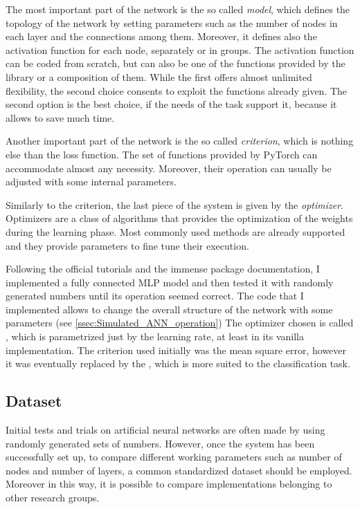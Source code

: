 The most important part of the network is the so called \textit{model}, which defines the topology of the network by setting parameters such as the number of nodes in each layer and the connections among them.
Moreover, it defines also the activation function for each node, separately or in groups.
The activation function can be coded from scratch, but can also be one of the functions provided by the library or a composition of them.
While the first offers almost unlimited flexibility, the second choice consents to exploit the functions already given.
The second option is the best choice, if the needs of the task support it, because it allows to save much time.

Another important part of the network is the so called \textit{criterion}, which is nothing else than the loss function.
The set of functions provided by PyTorch can accommodate almost any necessity.
Moreover, their operation can usually be adjusted with some internal parameters.

Similarly to the criterion, the last piece of the system is given by the \textit{optimizer}.
Optimizers are a class of algorithms that provides the optimization of the weights during the learning phase.
Most commonly used methods are already supported and they provide parameters to fine tune their execution.

Following the official tutorials and the immense package documentation, I implemented a fully connected \acf{MLP} model and then tested it with randomly generated numbers until its operation seemed correct.
The code that I implemented allows to change the overall structure of the network with some parameters (see \autoref{ssec:Simulated_ANN_operation})
The optimizer chosen is called , which is parametrized just by the learning rate, at least in its vanilla implementation.
The criterion used initially was the mean square error, however it was eventually replaced by the , which is more suited to the classification task.

\subsection{Dataset}
\label{ssec:PyDataset}
Initial tests and trials on artificial neural networks are often made by using randomly generated sets of numbers.
However, once the system has been successfully set up, to compare different working parameters such as number of nodes and number of layers, a common standardized dataset should be employed.
Moreover in this way, it is possible to compare implementations belonging to other research groups.

